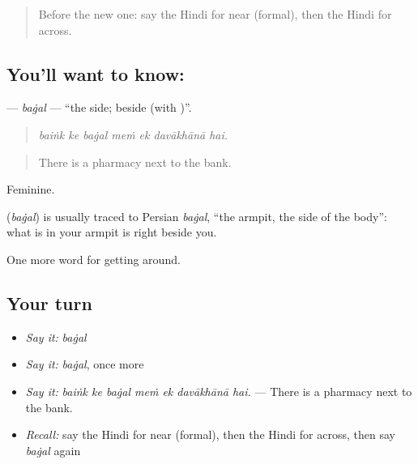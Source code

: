 \label{lesson:HI-C418-bagal}



\begin{quote}
Before the new one: say the Hindi for near (formal), then the Hindi for across.
\end{quote}

\subsection*{You'll want to know: }
\textbf{} — \emph{baġal} — \textquotedblleft{}the side; beside (with )\textquotedblright{}.

\begin{quote}
      
\end{quote}

\begin{quote}
\emph{baiṅk ke baġal meṁ ek davākhānā hai.}
\end{quote}

\begin{quote}
There is a pharmacy next to the bank.
\end{quote}

Feminine.

\begin{cousinweb}
\textbf{} (\emph{baġal}) is usually traced to Persian \emph{baġal}, \textquotedblleft{}the armpit, the side of the body\textquotedblright{}: what is in your armpit is right beside you.
\end{cousinweb}

\begin{grammarlens}[title={What you've built}]
One more word for getting around.
\end{grammarlens}

\subsection*{Your turn}
\begin{itemize}
\raggedright
  \item \emph{Say it:} \emph{baġal}
  \item \emph{Say it:} \emph{baġal}, once more
  \item \emph{Say it:} \emph{baiṅk ke baġal meṁ ek davākhānā hai.} — There is a pharmacy next to the bank.
  \item \emph{Recall:} say the Hindi for near (formal), then the Hindi for across, then say \emph{baġal} again
\end{itemize}

